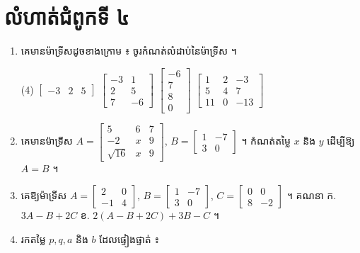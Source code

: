 \section*{លំហាត់ជំពូកទី ៤}
\begin{enumerate}[1]
  \item គេមានម៉ាទ្រីសដូចខាងក្រោម ៖ ចូរកំណត់លំដាប់នៃម៉ាទ្រីស ។
  \begin{tasks}(4)
    \task $\begin{bmatrix} -3 & 2 & 5 \end{bmatrix}$
    \task $\begin{bmatrix} -3 & 1\\ 2 & 5\\ 7 & -6 \end{bmatrix}$
    \task $\begin{bmatrix} -6\\ 7\\ 8\\ 0 \end{bmatrix}$
    \task $\begin{bmatrix} 1 & 2 & -3\\ 5 & 4 & 7\\ 11 & 0 & -13 \end{bmatrix}$
  \end{tasks}
  \item គេមានម៉ាទ្រីស $A = \begin{bmatrix} 5 & 6 & 7\\ -2 & x & 9\\ \sqrt{16} & x & 9 \end{bmatrix}$, $B = \begin{bmatrix} 1 & -7\\ 3 & 0 \end{bmatrix}$ ។ កំណត់តម្លៃ $x$ និង $y$ ដើម្បីឱ្យ $A = B$ ។
  \item គេឱ្យម៉ាទ្រីស $A = \begin{bmatrix} 2 & 0\\ -1 & 4 \end{bmatrix}$, $B = \begin{bmatrix} 1 & -7\\ 3 & 0 \end{bmatrix}$, $C = \begin{bmatrix} 0 & 0\\ 8 & -2 \end{bmatrix}$ ។ គណនា \quad ក. $3A - B + 2C$ \quad ខ. $2(A - B + 2C) + 3B - C$ ។
  \item រកតម្លៃ $p, q, a$ និង $b$ ដែលផ្ទៀងផ្ទាត់ ៖
  \begin{enumerate}[a]

\end{enumerate}
\end{enumerate}
